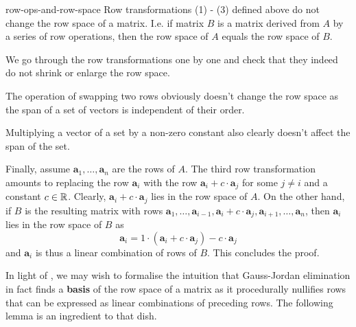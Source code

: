 \begin{lemma}{}{row-ops-and-row-space}
 Row transformations (1) - (3) defined above 
 do not change the row space of a matrix. I.e. if matrix $B$ is a matrix derived
 from $A$ by a series of row operations, then the row space of $A$ equals the
 row space of $B$.
\end{lemma}
\begin{lemproof}
 We go through the row transformations one by one and check that they indeed do
 not shrink or enlarge the row space.

 The operation of swapping two rows obviously doesn't change the row space as
 the span of a set of vectors is independent of their order.

 Multiplying a vector of a set by a non-zero constant also clearly doesn't
 affect the span of the set. 

 Finally, assume $\mathbf{a}_1,\ldots,\mathbf{a}_n$ are the rows of $A$. The
 third row transformation amounts to replacing the row $\mathbf{a}_i$ with the
 row $\mathbf{a}_i + c \cdot \mathbf{a}_j$ for some $j \neq i$ and a constant
 $c \in \mathbb{R}$. Clearly, $\mathbf{a}_i + c \cdot \mathbf{a}_j$ lies in the row
 space of $A$. On the other hand, if $B$ is the resulting matrix with rows
 $\mathbf{a}_1,\ldots,\mathbf{a}_{i-1},\mathbf{a}_i + c \cdot \mathbf{a}_j,
 \mathbf{a}_{i+1},\ldots,\mathbf{a}_n$, then $\mathbf{a}_i$ lies in the row
 space of $B$ as
 \[
  \mathbf{a}_i = 1 \cdot (\mathbf{a}_i + c \cdot \mathbf{a}_j) -c \cdot
  \mathbf{a}_j
 \]
 and $\mathbf{a}_i$ is thus a linear combination of rows of $B$. This concludes
 the proof.
\end{lemproof}

In light of , we may wish to formalise
the intuition that Gauss-Jordan elimination in fact finds a \textbf{basis} of
the row space of a matrix as it procedurally nullifies rows that can be
expressed as linear combinations of preceding rows. The following lemma is an
ingredient to that dish.

